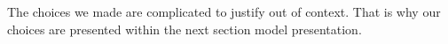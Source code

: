 
The choices we made are complicated to justify out of context. That is why our choices are presented within the next section model presentation.



